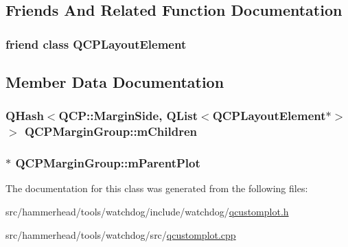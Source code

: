 \subsection{Friends And Related Function Documentation}
\subsubsection[{\texorpdfstring{Q\+C\+P\+Layout\+Element}{QCPLayoutElement}}]{\setlength{\rightskip}{0pt plus 5cm}friend class {\bf Q\+C\+P\+Layout\+Element}\hspace{0.3cm}{\ttfamily [friend]}}\hypertarget{classQCPMarginGroup_a0790750c7e7f14fdbd960d172655b42b}{}\label{classQCPMarginGroup_a0790750c7e7f14fdbd960d172655b42b}


\subsection{Member Data Documentation}
\subsubsection[{\texorpdfstring{m\+Children}{mChildren}}]{\setlength{\rightskip}{0pt plus 5cm}Q\+Hash$<${\bf Q\+C\+P\+::\+Margin\+Side}, Q\+List$<${\bf Q\+C\+P\+Layout\+Element}$\ast$$>$ $>$ Q\+C\+P\+Margin\+Group\+::m\+Children\hspace{0.3cm}{\ttfamily [protected]}}\hypertarget{classQCPMarginGroup_a954bc89ff8958b9bb6a4a0d08ed5fc0f}{}\label{classQCPMarginGroup_a954bc89ff8958b9bb6a4a0d08ed5fc0f}
\subsubsection[{\texorpdfstring{m\+Parent\+Plot}{mParentPlot}}]{$\ast$ Q\+C\+P\+Margin\+Group\+::m\+Parent\+Plot\hspace{0.3cm}{\ttfamily [protected]}}\hypertarget{classQCPMarginGroup_a23cfa29e3cc0f33a59141b77d8c04edf}{}\label{classQCPMarginGroup_a23cfa29e3cc0f33a59141b77d8c04edf}


The documentation for this class was generated from the following files\+:\begin{DoxyCompactItemize}
\item 
src/hammerhead/tools/watchdog/include/watchdog/\hyperlink{qcustomplot_8h}{qcustomplot.\+h}\item 
src/hammerhead/tools/watchdog/src/\hyperlink{qcustomplot_8cpp}{qcustomplot.\+cpp}\end{DoxyCompactItemize}
